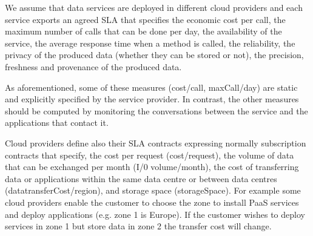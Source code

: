 We assume that data services are deployed in different cloud providers and each service exports an agreed SLA that specifies the economic cost per call, the maximum number of calls that can be done per day, the availability of the service, the average response time when a method is called, the reliability, the privacy of the produced data (whether they can be stored or not), the precision, freshness and provenance of the produced data. 

 
As  aforementioned, some of these measures ({\sf cost/call, maxCall/day}) are static and explicitly specified by the service provider. 
In contrast, the other measures should be computed by monitoring the conversations between the service and the applications that contact it.  


Cloud providers define also their SLA contracts expressing normally subscription contracts that specify, the cost per request ({\sf cost/request}), the volume of data that can be exchanged per month ({\sf I/0 volume/month}), the cost of transferring data or applications within the same data centre or between data centres ({\sf datatransferCost/region}), and storage space ({\sf storageSpace}). For example some cloud providers enable the customer to choose the zone to install PaaS services and deploy applications (e.g. zone 1 is Europe). If the customer wishes to deploy services in zone 1 but store data in zone 2 the transfer cost will change.

% 
 

